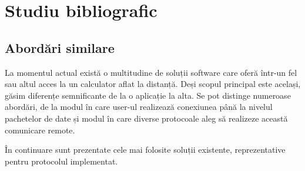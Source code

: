 
\chapter{Studiu bibliografic}
\label{cap:studiu-bibliografic}

%
%


\section{Abordări similare}

%
%
%
%

La momentul actual există o multitudine de soluții software care oferă într-un fel sau altul acces la un calculator aflat la distanță. Deși scopul principal este același, găsim diferențe semnificante de la o aplicație la alta. Se pot distinge numeroase abordări, de la modul în care user-ul realizează conexiunea până la nivelul pachetelor de date și modul în care diverse protocoale aleg să realizeze această comunicare remote.

În continuare sunt prezentate cele mai folosite soluții existente, reprezentative pentru protocolul implementat.


